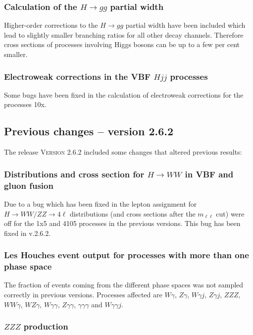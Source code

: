 \documentclass[english,12pt]{article}
\begin{document}
\subsubsection{Calculation of the $H\to gg$ partial width}

Higher-order corrections to the $H\to gg$ partial width have been included which lead to slightly smaller
branching ratios for all other decay channels. Therefore cross sections of processes involving Higgs bosons
can be up to a few per cent smaller.

\subsubsection{Electroweak corrections in the VBF $Hjj$ processes}

Some bugs have been fixed in the calculation of electroweak corrections for the processes 10x.


\subsection{Previous changes -- version 2.6.2}

The release \textsc{Version 2.6.2} included some changes that altered previous results:

\subsubsection{Distributions and cross section for $H\to WW$ in VBF and gluon fusion}

Due to a bug which has been fixed in the lepton assignment for $H\to WW/ZZ \to 4\ell$ distributions
(and cross sections after the $m_{\ell\ell}$ cut) were off for the 1x5 and 4105 processes
in the previous versions. This bug has been fixed in v.2.6.2.

\subsubsection{Les Houches event output for processes with more than one phase space}

The fraction of events coming from the different phase spaces was not sampled correctly 
in previous versions. Processes affected are $W\gamma$, $Z\gamma$, $W\gamma j$,
$Z\gamma j$, $ZZZ$, $WW\gamma$, $WZ\gamma$, $W\gamma\gamma$, $Z\gamma\gamma$,
$\gamma\gamma\gamma$ and $W\gamma\gamma j$.

\subsubsection{$ZZZ$ production}
\end{document}
